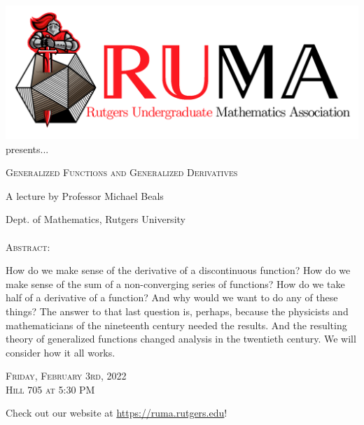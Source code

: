 \documentclass[12pt]{article}
\begin{document}

\begin{center}\includegraphics[scale=.2]{RUMAlogo.png}\\
\large  presents... \\

\vspace{1mm}
\begin{spacing}{2}
{\fontsize{28}{18}\selectfont  \textsc{
    Generalized Functions and Generalized Derivatives
    }} \end{spacing}
 
\begin{spacing}{1}
{\fontsize{18}{18} \selectfont A lecture by Professor Michael Beals}  \end{spacing} 
\large Dept. of Mathematics, Rutgers University \\~~\\

\normalsize
\textsc{Abstract:}

\LARGE
How do we make sense of the derivative of a discontinuous function?  How do we make sense of the sum of a non-converging series of functions?  How do we take half of a derivative of a function?  And why would we want to do any of these things?  The answer to that last question is, perhaps, because the physicists and mathematicians of the nineteenth century needed the results.  And the resulting theory of generalized functions changed analysis in the twentieth century.  We will consider how it all works.


\begin{spacing}{1.5}
    {\fontsize{24}{28}\selectfont  \textsc{
        Friday, February 3rd, 2022 \\ Hill 705 at 5:30 PM}
    } 
\end{spacing}

\Large  Check out our website at 
\url{https://ruma.rutgers.edu}!
\end{center}
\end{document}
